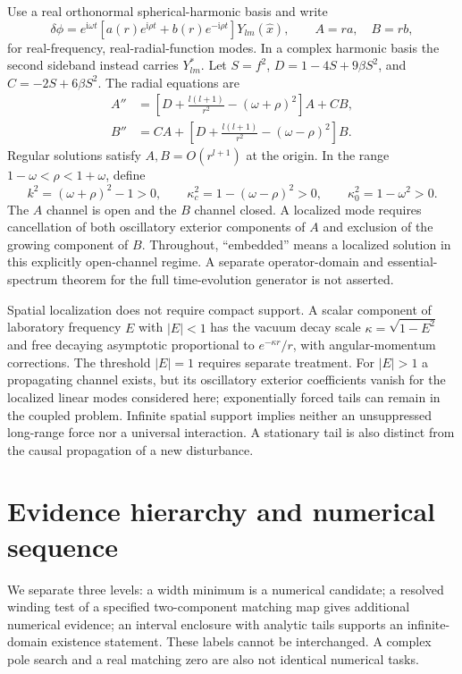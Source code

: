 \documentclass[a4paper,11pt]{article}
\newcommand{\ii}{\mathrm{i}}
\begin{document}
Use a real orthonormal spherical-harmonic basis and write
\begin{equation}\label{eq:ansatz}
\delta\phi=e^{\ii\omega t}
 [a(r)e^{\ii\rho t}+b(r)e^{-\ii\rho t}]Y_{lm}(\hat x),
\qquad A=ra,\quad B=rb,
\end{equation}
for real-frequency, real-radial-function modes. In a complex harmonic basis
the second sideband instead carries $Y_{lm}^*$.
Let $S=f^2$, $D=1-4S+9\beta S^2$, and $C=-2S+6\beta S^2$.
The radial equations are
\begin{align}
 A''&=\left[D+\frac{l(l+1)}{r^2}-(\omega+\rho)^2\right]A+CB,
 \label{eq:radialA}\\
 B''&=CA+\left[D+\frac{l(l+1)}{r^2}-(\omega-\rho)^2\right]B.
 \label{eq:radialB}
\end{align}
Regular solutions satisfy $A,B=O(r^{l+1})$ at the origin.
In the range $1-\omega<\rho<1+\omega$, define
\begin{equation}\label{eq:channels}
k^2=(\omega+\rho)^2-1>0,\qquad
\kappa_c^2=1-(\omega-\rho)^2>0,\qquad
\kappa_0^2=1-\omega^2>0.
\end{equation}
The $A$ channel is open and the $B$ channel closed. A localized mode
requires cancellation of both oscillatory exterior components of $A$
and exclusion of the growing component of $B$.
Throughout, ``embedded'' means a localized solution in this explicitly
open-channel regime. A separate operator-domain and essential-spectrum
theorem for the full time-evolution generator is not asserted.

Spatial localization does not require compact support. A scalar component
of laboratory frequency $E$ with $|E|<1$ has the vacuum decay scale
$\kappa=\sqrt{1-E^2}$ and free decaying asymptotic proportional to
$e^{-\kappa r}/r$, with angular-momentum corrections. The threshold
$|E|=1$ requires separate treatment. For $|E|>1$ a propagating channel
exists, but its oscillatory exterior coefficients vanish for the localized
linear modes considered here; exponentially forced tails can remain in
the coupled problem. Infinite spatial support implies neither an
unsuppressed long-range force nor a universal interaction. A stationary
tail is also distinct from the causal propagation of a new disturbance.



\section{Evidence hierarchy and numerical sequence}\label{sec:sequence}
We separate three levels: a width minimum is a numerical candidate;
a resolved winding test of a specified two-component matching map gives
additional numerical evidence; an interval enclosure with analytic tails
supports an infinite-domain existence statement. These labels cannot be
interchanged. A complex pole search and a real matching zero are also
not identical numerical tasks.
\end{document}
